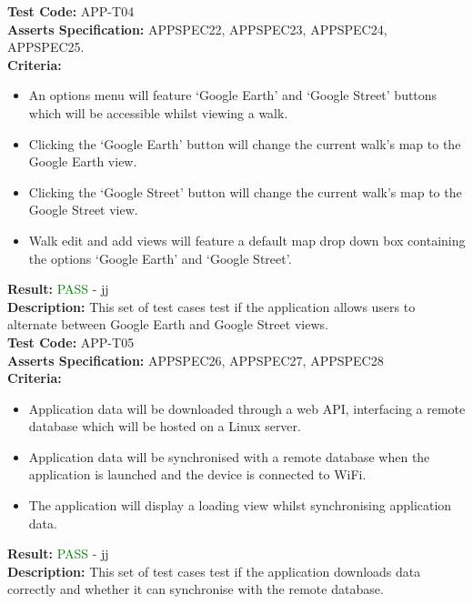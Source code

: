 \documentclass[11pt,a4paper]{report}
\begin{document}
\label{test:APP-T04}
\noindent\textbf{Test Code:} APP-T04\\
\textbf{Asserts Specification:} APPSPEC22, APPSPEC23, APPSPEC24, APPSPEC25.\\ 
\textbf{Criteria:} \begin{itemize}
                     \item An options menu will feature `Google Earth' and `Google Street' buttons which will be accessible whilst viewing a walk.
                     \item Clicking the `Google Earth' button will change the current walk's map to the Google Earth view.
                     \item Clicking the `Google Street' button will change the current walk's map to the Google Street view.
                     \item Walk edit and add views will feature a default map drop down box containing
                     the options `Google Earth' and `Google Street'.
                   \end{itemize}
\textbf{Result:} \textcolor{green}{PASS} - jj\\
\textbf{Description:} This set of test cases test if the application allows users to alternate between Google Earth and Google Street views.\\

\label{test:APP-T05}
\noindent\textbf{Test Code:} APP-T05\\
\textbf{Asserts Specification:} APPSPEC26, APPSPEC27, APPSPEC28\\ 
\textbf{Criteria:} \begin{itemize}
                     \item Application data will be downloaded through a web API, interfacing a remote database which will be hosted on a Linux server.
                     \item Application data will be synchronised with a remote database when the application is launched and the device is connected to WiFi.
                     \item The application will display a loading view whilst synchronising application data.
                   \end{itemize}
\textbf{Result:} \textcolor{green}{PASS} - jj\\
\textbf{Description:} This set of test cases test if the application downloads data correctly and whether it can synchronise with the remote database.\\
\end{document}
